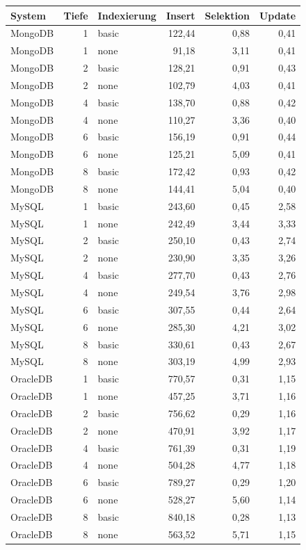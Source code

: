 \begin{tabular}{lrlrrr}
\toprule
System & Tiefe & Indexierung & Insert & Selektion & Update \\
\midrule
MongoDB & 1 & basic & 122,44 & 0,88 & 0,41 \\
MongoDB & 1 & none & 91,18 & 3,11 & 0,41 \\
MongoDB & 2 & basic & 128,21 & 0,91 & 0,43 \\
MongoDB & 2 & none & 102,79 & 4,03 & 0,41 \\
MongoDB & 4 & basic & 138,70 & 0,88 & 0,42 \\
MongoDB & 4 & none & 110,27 & 3,36 & 0,40 \\
MongoDB & 6 & basic & 156,19 & 0,91 & 0,44 \\
MongoDB & 6 & none & 125,21 & 5,09 & 0,41 \\
MongoDB & 8 & basic & 172,42 & 0,93 & 0,42 \\
MongoDB & 8 & none & 144,41 & 5,04 & 0,40 \\
MySQL & 1 & basic & 243,60 & 0,45 & 2,58 \\
MySQL & 1 & none & 242,49 & 3,44 & 3,33 \\
MySQL & 2 & basic & 250,10 & 0,43 & 2,74 \\
MySQL & 2 & none & 230,90 & 3,35 & 3,26 \\
MySQL & 4 & basic & 277,70 & 0,43 & 2,76 \\
MySQL & 4 & none & 249,54 & 3,76 & 2,98 \\
MySQL & 6 & basic & 307,55 & 0,44 & 2,64 \\
MySQL & 6 & none & 285,30 & 4,21 & 3,02 \\
MySQL & 8 & basic & 330,61 & 0,43 & 2,67 \\
MySQL & 8 & none & 303,19 & 4,99 & 2,93 \\
OracleDB & 1 & basic & 770,57 & 0,31 & 1,15 \\
OracleDB & 1 & none & 457,25 & 3,71 & 1,16 \\
OracleDB & 2 & basic & 756,62 & 0,29 & 1,16 \\
OracleDB & 2 & none & 470,91 & 3,92 & 1,17 \\
OracleDB & 4 & basic & 761,39 & 0,31 & 1,19 \\
OracleDB & 4 & none & 504,28 & 4,77 & 1,18 \\
OracleDB & 6 & basic & 789,27 & 0,29 & 1,20 \\
OracleDB & 6 & none & 528,27 & 5,60 & 1,14 \\
OracleDB & 8 & basic & 840,18 & 0,28 & 1,13 \\
OracleDB & 8 & none & 563,52 & 5,71 & 1,15 \\
\bottomrule
\end{tabular}
